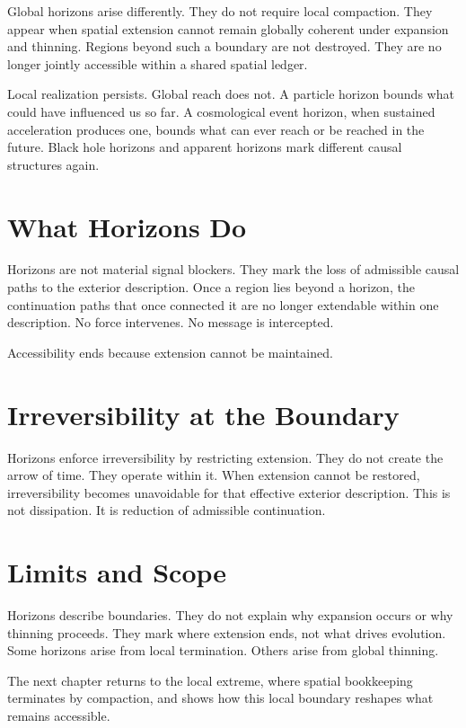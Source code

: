 \documentclass[11pt,twoside,openright]{book}
\begin{document}
Global horizons arise differently. They do not require local compaction. They appear when spatial extension cannot remain globally coherent under expansion and thinning. Regions beyond such a boundary are not destroyed. They are no longer jointly accessible within a shared spatial ledger.

Local realization persists. Global reach does not. A particle horizon bounds what could have influenced us so far. A cosmological event horizon, when sustained acceleration produces one, bounds what can ever reach or be reached in the future. Black hole horizons and apparent horizons mark different causal structures again.

\section*{What Horizons Do}

Horizons are not material signal blockers. They mark the loss of admissible causal paths to the exterior description. Once a region lies beyond a horizon, the continuation paths that once connected it are no longer extendable within one description. No force intervenes. No message is intercepted.

Accessibility ends because extension cannot be maintained.

\section*{Irreversibility at the Boundary}

Horizons enforce irreversibility by restricting extension. They do not create the arrow of time. They operate within it. When extension cannot be restored, irreversibility becomes unavoidable for that effective exterior description. This is not dissipation. It is reduction of admissible continuation.

\section*{Limits and Scope}

Horizons describe boundaries. They do not explain why expansion occurs or why thinning proceeds. They mark where extension ends, not what drives evolution. Some horizons arise from local termination. Others arise from global thinning.

The next chapter returns to the local extreme, where spatial bookkeeping terminates by compaction, and shows how this local boundary reshapes what remains accessible.
\end{document}
